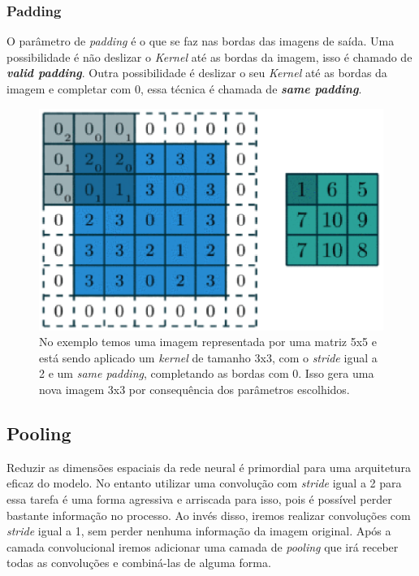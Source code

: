 \subsubsection{Padding}

O parâmetro de \textit{padding} é o que se faz nas bordas das imagens
de saída. Uma possibilidade é não deslizar o \textit{Kernel} até as
bordas da imagem, isso é chamado de {\bf \emph{valid padding}}. Outra
possibilidade é deslizar o seu \textit{Kernel} até as bordas da imagem
e completar com 0, essa técnica é chamada de {\bf \emph{same
    padding}}.

\begin{figure}[H]
\centering
\includegraphics[scale=0.6]{imagens/conv_kernel_pad_stride.eps}
\caption{No exemplo temos uma imagem representada por uma matriz 5x5 e
  está sendo aplicado um \textit{kernel} de tamanho 3x3, com o
  \textit{stride} igual a 2 e um \textit{same padding}, completando as
  bordas com 0. Isso gera uma nova imagem 3x3 por consequência dos
  parâmetros escolhidos.}
\label{fig:conv_kernel_pad_stride}
\end{figure}

\subsection{Pooling}

Reduzir as dimensões espaciais da rede neural é primordial para
uma arquitetura eficaz do modelo. No entanto utilizar uma convolução
com \textit{stride} igual a 2 para essa tarefa é uma forma agressiva e
arriscada para isso, pois é possível perder bastante informação no
processo. Ao invés disso, iremos realizar convoluções com
\textit{stride} igual a 1, sem perder nenhuma informação da imagem
original. Após a camada convolucional iremos adicionar uma camada de
\textit{pooling} que irá receber todas as convoluções e combiná-las de
alguma forma\cite{Dumoulin2016}.

